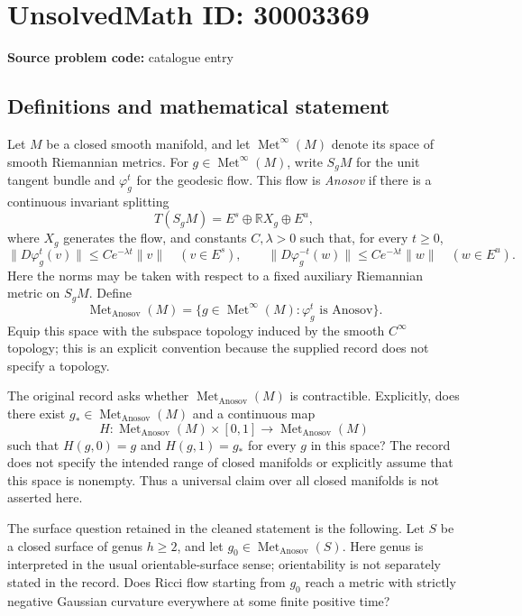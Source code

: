 \documentclass[11pt]{article}
\newcommand{\R}{\mathbb{R}}
\begin{document}
\section*{UnsolvedMath ID: 30003369}
\textbf{Source problem code:} catalogue entry
\subsection{Definitions and mathematical statement}
Let \(M\) be a closed smooth manifold, and let \(\operatorname{Met}^{\infty}(M)\) denote its space of smooth Riemannian metrics. For \(g\in\operatorname{Met}^{\infty}(M)\), write \(S_gM\) for the unit tangent bundle and \(\varphi_g^t\) for the geodesic flow. This flow is \emph{Anosov} if there is a continuous invariant splitting
\[
T(S_gM)=E^s\oplus\R X_g\oplus E^u,
\]
where \(X_g\) generates the flow, and constants \(C,\lambda>0\) such that, for every \(t\geq0\),
\[
\|D\varphi_g^t(v)\|\leq Ce^{-\lambda t}\|v\|\quad(v\in E^s),\qquad
\|D\varphi_g^{-t}(w)\|\leq Ce^{-\lambda t}\|w\|\quad(w\in E^u).
\]
Here the norms may be taken with respect to a fixed auxiliary Riemannian metric on \(S_gM\). Define
\[
\operatorname{Met}_{\mathrm{Anosov}}(M)
=\{g\in\operatorname{Met}^{\infty}(M):\varphi_g^t\text{ is Anosov}\}.
\]
Equip this space with the subspace topology induced by the smooth \(C^{\infty}\) topology; this is an explicit convention because the supplied record does not specify a topology.

The original record asks whether \(\operatorname{Met}_{\mathrm{Anosov}}(M)\) is contractible. Explicitly, does there exist \(g_*\in\operatorname{Met}_{\mathrm{Anosov}}(M)\) and a continuous map
\[
H:\operatorname{Met}_{\mathrm{Anosov}}(M)\times[0,1]
\longrightarrow\operatorname{Met}_{\mathrm{Anosov}}(M)
\]
such that \(H(g,0)=g\) and \(H(g,1)=g_*\) for every \(g\) in this space? The record does not specify the intended range of closed manifolds or explicitly assume that this space is nonempty. Thus a universal claim over all closed manifolds is not asserted here.

The surface question retained in the cleaned statement is the following. Let \(S\) be a closed surface of genus \(h\geq2\), and let \(g_0\in\operatorname{Met}_{\mathrm{Anosov}}(S)\). Here genus is interpreted in the usual orientable-surface sense; orientability is not separately stated in the record. Does Ricci flow starting from \(g_0\) reach a metric with strictly negative Gaussian curvature everywhere at some finite positive time?
\end{document}
